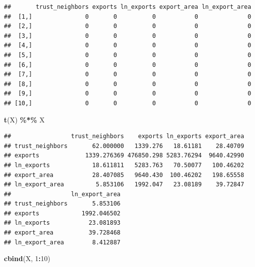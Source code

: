 \documentclass[
]{book}
\newenvironment{Shaded}{\begin{snugshade}}{\end{snugshade}}
\newcommand{\DecValTok}[1]{\textcolor[rgb]{0.00,0.00,0.81}{#1}}
\newcommand{\KeywordTok}[1]{\textcolor[rgb]{0.13,0.29,0.53}{\textbf{#1}}}
\newcommand{\NormalTok}[1]{#1}
\newcommand{\OperatorTok}[1]{\textcolor[rgb]{0.81,0.36,0.00}{\textbf{#1}}}
\newcommand{\StringTok}[1]{\textcolor[rgb]{0.31,0.60,0.02}{#1}}
\theoremstyle{definition}
\theoremstyle{definition}
\theoremstyle{definition}
\theoremstyle{remark}
\begin{document}
\begin{verbatim}
##       trust_neighbors exports ln_exports export_area ln_export_area
##  [1,]               0       0          0           0              0
##  [2,]               0       0          0           0              0
##  [3,]               0       0          0           0              0
##  [4,]               0       0          0           0              0
##  [5,]               0       0          0           0              0
##  [6,]               0       0          0           0              0
##  [7,]               0       0          0           0              0
##  [8,]               0       0          0           0              0
##  [9,]               0       0          0           0              0
## [10,]               0       0          0           0              0
\end{verbatim}

\begin{Shaded}
\begin{Highlighting}[]
\KeywordTok{t}\NormalTok{(X) }\OperatorTok{\%*\%}\StringTok{ }\NormalTok{X}
\end{Highlighting}
\end{Shaded}

\begin{verbatim}
##                 trust_neighbors    exports ln_exports export_area
## trust_neighbors       62.000000   1339.276   18.61181    28.40709
## exports             1339.276369 476850.298 5283.76294  9640.42990
## ln_exports            18.611811   5283.763   70.50077   100.46202
## export_area           28.407085   9640.430  100.46202   198.65558
## ln_export_area         5.853106   1992.047   23.08189    39.72847
##                 ln_export_area
## trust_neighbors       5.853106
## exports            1992.046502
## ln_exports           23.081893
## export_area          39.728468
## ln_export_area        8.412887
\end{verbatim}

\begin{Shaded}
\begin{Highlighting}[]
\KeywordTok{cbind}\NormalTok{(X, }\DecValTok{1}\OperatorTok{:}\DecValTok{10}\NormalTok{)}
\end{Highlighting}
\end{Shaded}
\end{document}
